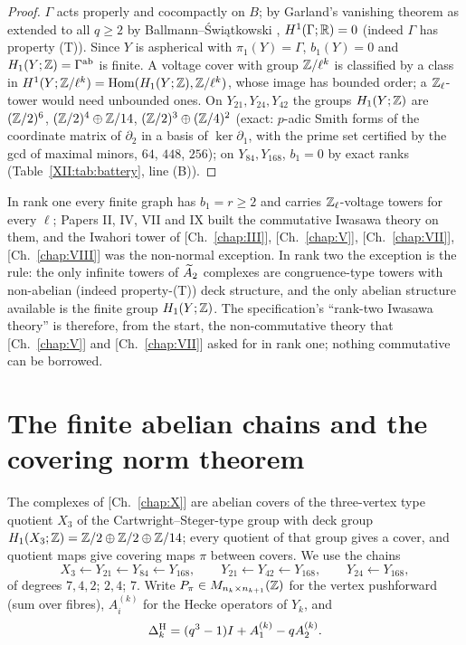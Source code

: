 \begin{proof}
$\Gamma$ acts properly and cocompactly on $B$; by Garland's vanishing theorem as extended
to all $q\ge2$ by Ballmann--\'Swi\k{a}tkowski \cite{Ga,BSw}, $H^{1}(\Gamma;\mathbb{R})=0$ (indeed
$\Gamma$ has property (T)). Since $Y$ is aspherical with $\pi_1(Y)=\Gamma$, $b_1(Y)=0$ and
$H_1(Y;\mathbb{Z})=\Gamma^{\mathrm{ab}}$ is finite. A voltage cover with group $\mathbb{Z}/\ell^{k}$ is
classified by a class in $H^{1}(Y;\mathbb{Z}/\ell^{k})=\operatorname{Hom}(H_1(Y;\mathbb{Z}),\mathbb{Z}/\ell^{k})$, whose image
has bounded order; a $\mathbb{Z}_\ell$-tower would need unbounded ones. On $Y_{21},Y_{24},Y_{42}$
the groups $H_1(Y;\mathbb{Z})$ are $(\mathbb{Z}/2)^{6}$, $(\mathbb{Z}/2)^{4}\oplus\mathbb{Z}/14$, $(\mathbb{Z}/2)^{3}\oplus(\mathbb{Z}/4)^{2}$
(exact: $p$-adic Smith forms of the coordinate matrix of $\partial_2$ in a basis of
$\ker\partial_1$, with the prime set certified by the gcd of maximal minors, $64$, $448$,
$256$); on $Y_{84},Y_{168}$, $b_1=0$ by exact ranks (Table~\ref{XII:tab:battery}, line (B)).
\end{proof}

\begin{remark}\label{XII:rem:framework}
In rank one every finite graph has $b_1=r\ge2$ and carries $\mathbb{Z}_\ell$-voltage towers for
every $\ell$; Papers II, IV, VII and IX built the commutative Iwasawa theory on them, and the
Iwahori tower of [Ch.~\ref{chap:III}], [Ch.~\ref{chap:V}], [Ch.~\ref{chap:VII}], [Ch.~\ref{chap:VIII}] was the non-normal exception. In rank two the
exception is the rule: the only infinite towers of $\widetilde A_2$ complexes are congruence-type
towers with non-abelian (indeed property-(T)) deck structure, and the only abelian
structure available is the finite group $H_1(Y;\mathbb{Z})$. The specification's ``rank-two Iwasawa
theory'' is therefore, from the start, the non-commutative theory that [Ch.~\ref{chap:V}] and [Ch.~\ref{chap:VII}] asked
for in rank one; nothing commutative can be borrowed.
\end{remark}

\section{The finite abelian chains and the covering norm theorem}\label{XII:sec:chain}

The complexes of [Ch.~\ref{chap:X}] are abelian covers of the three-vertex type quotient $X_3$ of the
Cartwright--Steger-type group with deck group $H_1(X_3;\mathbb{Z})=\mathbb{Z}/2\oplus\mathbb{Z}/2\oplus\mathbb{Z}/14$; every
quotient of that group gives a cover, and quotient maps give covering maps $\pi$ between
covers. We use the chains
\[
X_3\leftarrow Y_{21}\leftarrow Y_{84}\leftarrow Y_{168},\qquad
Y_{21}\leftarrow Y_{42}\leftarrow Y_{168},\qquad Y_{24}\leftarrow Y_{168},
\]
of degrees $7,4,2$; $2,4$; $7$. Write $P_\pi\in M_{n_k\times n_{k+1}}(\mathbb{Z})$ for the vertex
pushforward (sum over fibres), $A_i^{(k)}$ for the Hecke operators of $Y_k$, and
\[
\Delta^{\mathrm{H}}_k=(q^{3}-1)I+A_1^{(k)}-qA_2^{(k)} .
\]


